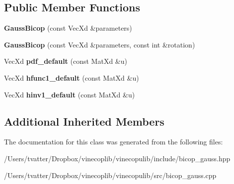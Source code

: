 \subsection*{Public Member Functions}
\begin{DoxyCompactItemize}
\item 
\mbox{\label{class_gauss_bicop_a7701b11601e7d9cb0c49aa449440924e}} 
{\bfseries Gauss\+Bicop} (const Vec\+Xd \&parameters)
\item 
\mbox{\label{class_gauss_bicop_aa3ca70729cc7f4b027dc660cf47bf908}} 
{\bfseries Gauss\+Bicop} (const Vec\+Xd \&parameters, const int \&rotation)
\item 
\mbox{\label{class_gauss_bicop_ae12c6e56243c6f2d2878fa403f2ccb91}} 
Vec\+Xd {\bfseries pdf\+\_\+default} (const Mat\+Xd \&u)
\item 
\mbox{\label{class_gauss_bicop_a9a6e04b749c34920cc8c981dd8114c2b}} 
Vec\+Xd {\bfseries hfunc1\+\_\+default} (const Mat\+Xd \&u)
\item 
\mbox{\label{class_gauss_bicop_a298263b90ef2ab40190d4fe00bd9196c}} 
Vec\+Xd {\bfseries hinv1\+\_\+default} (const Mat\+Xd \&u)
\end{DoxyCompactItemize}
\subsection*{Additional Inherited Members}


The documentation for this class was generated from the following files\+:\begin{DoxyCompactItemize}
\item 
/\+Users/tvatter/\+Dropbox/vinecoplib/vinecopulib/include/bicop\+\_\+gauss.\+hpp\item 
/\+Users/tvatter/\+Dropbox/vinecoplib/vinecopulib/src/bicop\+\_\+gauss.\+cpp\end{DoxyCompactItemize}
